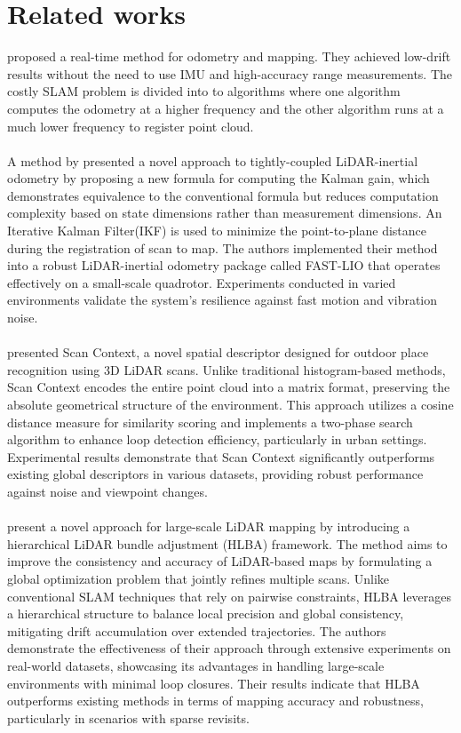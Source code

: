 \section{Related works}
\cite{zhang2014loam} proposed a real-time method for odometry and mapping. They achieved low-drift results without the need to use IMU and high-accuracy range measurements. The costly SLAM problem is divided into to algorithms where one algorithm computes the odometry at a higher frequency and the other algorithm runs at a much lower frequency to register point cloud.
\\ \\
A method by \cite{xu2021fastlio} presented a novel approach to tightly-coupled LiDAR-inertial odometry by proposing a new formula for computing the Kalman gain, which demonstrates equivalence to the conventional formula but reduces computation complexity based on state dimensions rather than measurement dimensions. An Iterative Kalman Filter(IKF) is used to minimize the point-to-plane distance during the registration of scan to map. The authors implemented their method into a robust LiDAR-inertial odometry package called FAST-LIO that operates effectively on a small-scale quadrotor. Experiments conducted in varied environments validate the system's resilience against fast motion and vibration noise.
\\ \\
\cite{kim2018scan} presented Scan Context, a novel spatial descriptor designed for outdoor place recognition using 3D LiDAR scans. Unlike traditional histogram-based methods, Scan Context encodes the entire point cloud into a matrix format, preserving the absolute geometrical structure of the environment. This approach utilizes a cosine distance measure for similarity scoring and implements a two-phase search algorithm to enhance loop detection efficiency, particularly in urban settings. Experimental results demonstrate that Scan Context significantly outperforms existing global descriptors in various datasets, providing robust performance against noise and viewpoint changes.

\paragraph{}  
\cite{10024300} present a novel approach for large-scale LiDAR mapping by introducing a hierarchical LiDAR bundle adjustment (HLBA) framework. The method aims to improve the consistency and accuracy of LiDAR-based maps by formulating a global optimization problem that jointly refines multiple scans. Unlike conventional SLAM techniques that rely on pairwise constraints, HLBA leverages a hierarchical structure to balance local precision and global consistency, mitigating drift accumulation over extended trajectories. The authors demonstrate the effectiveness of their approach through extensive experiments on real-world datasets, showcasing its advantages in handling large-scale environments with minimal loop closures. Their results indicate that HLBA outperforms existing methods in terms of mapping accuracy and robustness, particularly in scenarios with sparse revisits.

